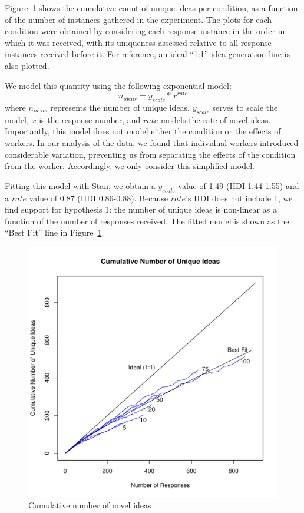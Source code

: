 Figure~\ref{fig:cumulative_ideas} shows the cumulative count of unique ideas per condition, as a function of the number of instances gathered in the experiment. The plots for each condition were obtained by considering each response instance in the order in which it was received, with its uniqueness assessed relative to all response instances received before it. For reference, an ideal ``1:1'' idea generation line is also plotted.

We model this quantity using the following exponential model:
\[n_{ideas} = y_{scale} * x^{rate}\]
where $n_{ideas}$ represents the number of unique ideas, $y_{scale}$ serves to scale the model, $x$ is the response number, and $rate$ models the rate of novel ideas. Importantly, this model does not model either the condition or the effects of workers. In our analysis of the data, we found that individual workers introduced considerable variation, preventing us from separating the effects of the condition from the worker. Accordingly, we only consider this simplified model.

Fitting this model with Stan, we obtain a $y_{scale}$ value of 1.49 (HDI 1.44-1.55) and a $rate$ value of 0.87 (HDI 0.86-0.88). Because $rate$'s HDI does not include 1, we find support for hypothesis 1: the number of unique ideas is non-linear as a function of the number of responses received. The fitted model is shown as the ``Best Fit'' line in Figure~\ref{fig:cumulative_ideas}.

\begin{figure}[h!]
    \centering
    \includegraphics[width=0.9\columnwidth]{cumulative_ideas}
    \caption{Cumulative number of novel ideas}
    \label{fig:cumulative_ideas}
\end{figure}

